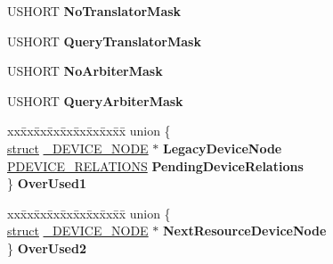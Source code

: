 \begin{DoxyCompactItemize}
U\+S\+H\+O\+RT {\bfseries No\+Translator\+Mask}
\item 
\mbox{\label{struct___d_e_v_i_c_e___n_o_d_e_adf306cf2dbc58f89868461097c44dcbd}} 
U\+S\+H\+O\+RT {\bfseries Query\+Translator\+Mask}
\item 
\mbox{\label{struct___d_e_v_i_c_e___n_o_d_e_a5b5c201075ed21112e710b08ccc73122}} 
U\+S\+H\+O\+RT {\bfseries No\+Arbiter\+Mask}
\item 
\mbox{\label{struct___d_e_v_i_c_e___n_o_d_e_a23a6703b5fb18e9c86c9d421627151b8}} 
U\+S\+H\+O\+RT {\bfseries Query\+Arbiter\+Mask}
\item 
\mbox{\label{struct___d_e_v_i_c_e___n_o_d_e_af5683fef9483ebb9de8c6376c8101c6f}} 
\begin{tabbing}
xx\=xx\=xx\=xx\=xx\=xx\=xx\=xx\=xx\=\kill
union \{\\
\>\hyperlink{interfacestruct}{struct} \hyperlink{struct___d_e_v_i_c_e___n_o_d_e}{\_DEVICE\_NODE} $\ast$ {\bfseries LegacyDeviceNode}\\
\>\hyperlink{struct___d_e_v_i_c_e___r_e_l_a_t_i_o_n_s}{PDEVICE\_RELATIONS} {\bfseries PendingDeviceRelations}\\
\} {\bfseries OverUsed1}\\

\end{tabbing}\item 
\mbox{\label{struct___d_e_v_i_c_e___n_o_d_e_a22b86508d56a6c38825ebcc72948b5d1}} 
\begin{tabbing}
xx\=xx\=xx\=xx\=xx\=xx\=xx\=xx\=xx\=\kill
union \{\\
\>\hyperlink{interfacestruct}{struct} \hyperlink{struct___d_e_v_i_c_e___n_o_d_e}{\_DEVICE\_NODE} $\ast$ {\bfseries NextResourceDeviceNode}\\
\} {\bfseries OverUsed2}\\


\end{tabbing}
\end{DoxyCompactItemize}
